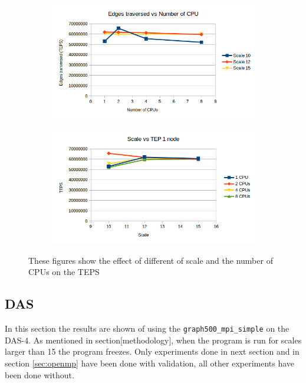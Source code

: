 \begin{figure}[!h]
\centering
\begin{subfigure}{.5\textwidth}
  \centering
  \includegraphics[width=\linewidth]{images/openmp_cpus.png}
\end{subfigure}%
\begin{subfigure}{.5\textwidth}
  \centering
  \includegraphics[width=\linewidth]{images/openmp_scale.png}
\end{subfigure}
\caption{These figures show the effect of different of scale and the number of CPUs on the TEPS}
\label{fig:openmp_scale_cpu}
\end{figure}

\subsection{DAS}
In this section the results are shown of using the \texttt{graph500\_mpi\_simple} on the DAS-4. As mentioned in section[methodology], when the program is run for scales larger than 15 the program freezes. Only experiments done in next section and in section \ref{sec:openmp} have been done with validation, all other experiments have been done without.

